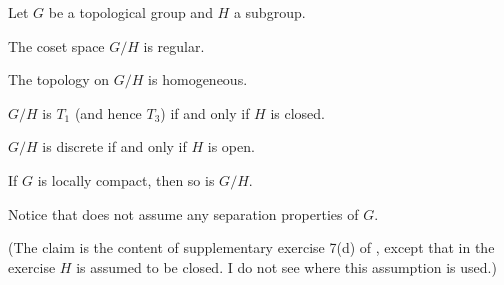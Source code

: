 \documentclass[article, a4paper, 11pt, oneside]{memoir}
\numberwithin{equation}{chapter}
\begin{document}
\begin{proposition}
    Let $G$ be a topological group and $H$ a subgroup.
    \begin{enumprop}
        \item \label{enum:coset_space_regular} The coset space $G/H$ is regular.

        \item The topology on $G/H$ is homogeneous.
        
        \item \label{enum:coset_space_T1} $G/H$ is $T_1$ (and hence $T_3$) if and only if $H$ is closed.

        \item $G/H$ is discrete if and only if $H$ is open.
        
        \item \label{enum:coset_space_locally_compact} If $G$ is locally compact\footnotemark, then so is $G/H$.
    \end{enumprop}
\end{proposition}
%
Notice that  does not assume any separation properties of $G$.

(The claim  is the content of supplementary exercise 7(d) of \textcite[Chapter~2]{munkres}, except that in the exercise $H$ is assumed to be closed. I do not see where this assumption is used.)
\end{document}
